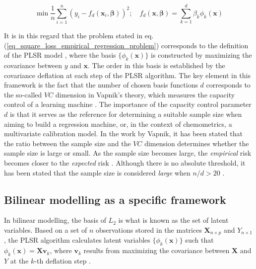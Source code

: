 \documentclass[journal=ancham,manuscript=article]{achemso}
\begin{document}
\begin{equation}
    \min \frac{1}{n} \sum_{i=1}^n (y_i-f_d(\mathbf{x}_i, \boldsymbol{\beta}))^2; \quad f_d(\mathbf{x}, \boldsymbol{\beta}) = \sum_{k=1}^{d} \beta_k \phi_{k}(\mathbf{x})
    \label{eq_square_loss_empirical_regression_problem}
\end{equation}

It is in this regard that the problem stated in eq. (\ref{eq_square_loss_empirical_regression_problem}) corresponds to the definition of the PLSR model  \cite{Stone1990}, where the basis $\{\phi_{k}(\mathbf{x})\}$ is constructed by maximizing the covariance between $y$ and $\mathbf{x}$. The order in this basis is established by the covariance deflation at each step of the PLSR algorithm. The key element in this framework is the fact that the number of chosen basis functions $d$ corresponds to the so-called $VC$ dimension in Vapnik's theory, which measures the capacity control of a learning machine \cite{Vapnik2019}. The importance of the capacity control parameter $d$ is that it serves as the reference for determining a suitable sample size when aiming to build a regression machine, or, in the context of chemometrics, a multivariate calibration model. In the work by Vapnik, it has been stated that the ratio between the sample size and the $VC$ dimension determines whether the sample size is large or small. As the sample size becomes large, the \emph{empirical} risk becomes closer to the \emph{expected} risk \cite{Vapnik2000}. Although there is no absolute threshold, it has been stated that the sample size is considered \emph{large} when  $n/d>20$ \cite{Vapnik2000}.


\subsection{Bilinear modelling as a specific framework}

In bilinear modelling, the basis of $L_2$ is what is known as the set of latent variables. Based on a set of $n$ observations stored in the matrices $\mathbf{X}_{n\times p}$ and $Y_{n\times 1}$, the PLSR algorithm calculates latent variables $\{\phi_{k}(\mathbf{x})\}$ such that $\phi_k(\mathbf{x}) = \mathbf{Xv}_{k}$, where $\mathbf{v}_k$ results from maximizing the covariance between $\mathbf{X}$ and $Y$ at the $k$-th deflation step \cite{DeJong1993}. 
\end{document}
